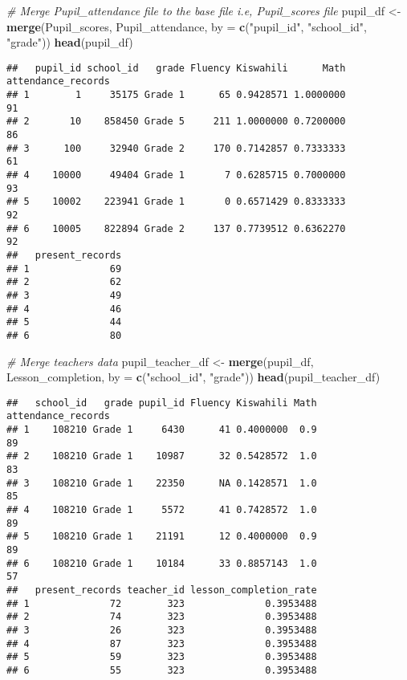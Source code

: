 \documentclass[
]{article}
\newenvironment{Shaded}{\begin{snugshade}}{\end{snugshade}}
\newcommand{\AttributeTok}[1]{\textcolor[rgb]{0.13,0.29,0.53}{#1}}
\newcommand{\CommentTok}[1]{\textcolor[rgb]{0.56,0.35,0.01}{\textit{#1}}}
\newcommand{\FunctionTok}[1]{\textcolor[rgb]{0.13,0.29,0.53}{\textbf{#1}}}
\newcommand{\NormalTok}[1]{#1}
\newcommand{\OtherTok}[1]{\textcolor[rgb]{0.56,0.35,0.01}{#1}}
\newcommand{\StringTok}[1]{\textcolor[rgb]{0.31,0.60,0.02}{#1}}
\begin{document}
\begin{Shaded}
\begin{Highlighting}[]
\CommentTok{\# Merge Pupil\_attendance file to the base file i.e, Pupil\_scores file}
\NormalTok{pupil\_df }\OtherTok{\textless{}{-}} \FunctionTok{merge}\NormalTok{(Pupil\_scores, Pupil\_attendance, }\AttributeTok{by =} \FunctionTok{c}\NormalTok{(}\StringTok{"pupil\_id"}\NormalTok{, }\StringTok{"school\_id"}\NormalTok{, }\StringTok{"grade"}\NormalTok{))}
\FunctionTok{head}\NormalTok{(pupil\_df)}
\end{Highlighting}
\end{Shaded}

\begin{verbatim}
##   pupil_id school_id   grade Fluency Kiswahili      Math attendance_records
## 1        1     35175 Grade 1      65 0.9428571 1.0000000                 91
## 2       10    858450 Grade 5     211 1.0000000 0.7200000                 86
## 3      100     32940 Grade 2     170 0.7142857 0.7333333                 61
## 4    10000     49404 Grade 1       7 0.6285715 0.7000000                 93
## 5    10002    223941 Grade 1       0 0.6571429 0.8333333                 92
## 6    10005    822894 Grade 2     137 0.7739512 0.6362270                 92
##   present_records
## 1              69
## 2              62
## 3              49
## 4              46
## 5              44
## 6              80
\end{verbatim}

\begin{Shaded}
\begin{Highlighting}[]
\CommentTok{\# Merge teacher\textquotesingle{}s data}
\NormalTok{pupil\_teacher\_df }\OtherTok{\textless{}{-}} \FunctionTok{merge}\NormalTok{(pupil\_df, Lesson\_completion, }\AttributeTok{by =} \FunctionTok{c}\NormalTok{(}\StringTok{"school\_id"}\NormalTok{, }\StringTok{"grade"}\NormalTok{))}
\FunctionTok{head}\NormalTok{(pupil\_teacher\_df)}
\end{Highlighting}
\end{Shaded}

\begin{verbatim}
##   school_id   grade pupil_id Fluency Kiswahili Math attendance_records
## 1    108210 Grade 1     6430      41 0.4000000  0.9                 89
## 2    108210 Grade 1    10987      32 0.5428572  1.0                 83
## 3    108210 Grade 1    22350      NA 0.1428571  1.0                 85
## 4    108210 Grade 1     5572      41 0.7428572  1.0                 89
## 5    108210 Grade 1    21191      12 0.4000000  0.9                 89
## 6    108210 Grade 1    10184      33 0.8857143  1.0                 57
##   present_records teacher_id lesson_completion_rate
## 1              72        323              0.3953488
## 2              74        323              0.3953488
## 3              26        323              0.3953488
## 4              87        323              0.3953488
## 5              59        323              0.3953488
## 6              55        323              0.3953488
\end{verbatim}
\end{document}
